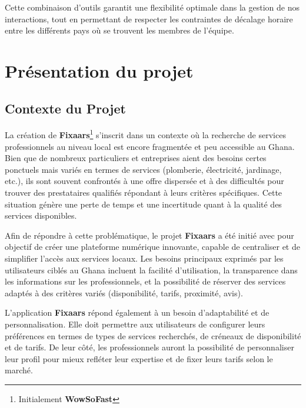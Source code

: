 {Cette combinaison d'outils garantit une flexibilité optimale dans la gestion de nos interactions, tout en permettant de respecter les contraintes de décalage horaire entre les différents pays où se trouvent les membres de l'équipe.

\chapter{Présentation du projet}

\section{Contexte du Projet} \label{context_du_projet}

La création de \textbf{Fixaars}\footnote{Initialement \textbf{WowSoFast}} s’inscrit dans un contexte où la recherche de services professionnels au niveau local est encore fragmentée et peu accessible au Ghana. Bien que de nombreux particuliers et entreprises aient des besoins certes ponctuels mais variés en termes de services (plomberie, électricité, jardinage, etc.), ils sont souvent confrontés à une offre dispersée et à des difficultés pour trouver des prestataires qualifiés répondant à leurs critères spécifiques. Cette situation génère une perte de temps et une incertitude quant à la qualité des services disponibles.

\vspace{0.35cm}

Afin de répondre à cette problématique, le projet \textbf{Fixaars} a été initié avec pour objectif de créer une plateforme numérique innovante, capable de centraliser et de simplifier l’accès aux services locaux. Les besoins principaux exprimés par les utilisateurs ciblés au Ghana incluent la facilité d’utilisation, la transparence dans les informations sur les professionnels, et la possibilité de réserver des services adaptés à des critères variés (disponibilité, tarifs, proximité, avis).

\vspace{0.35cm}

L’application \textbf{Fixaars} répond également à un besoin d’adaptabilité et de personnalisation. Elle doit permettre aux utilisateurs de configurer leurs préférences en termes de types de services recherchés, de créneaux de disponibilité et de tarifs. De leur côté, les professionnels auront la possibilité de personnaliser leur profil pour mieux refléter leur expertise et de fixer leurs tarifs selon le marché.

}
